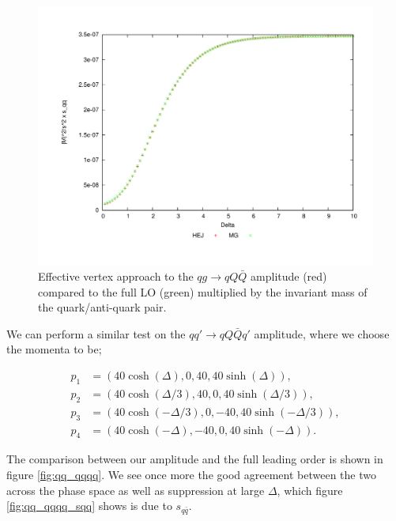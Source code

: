 \begin{figure}[H]
\centering
\includegraphics[scale=0.45]{Images/qg_qQQx_sqqx.pdf}
\caption{Effective vertex approach to the $qg \to qQ\bar{Q}$ amplitude (red) compared to the full LO (green) multiplied by the invariant mass of the quark/anti-quark pair.}
\label{fig:qg_qqqx_sqqx}
\end{figure}

We can perform a similar test on the $qq' \to qQ\bar{Q}q'$ amplitude, where we choose the momenta to be;

\begin{equation}
\begin{split}
p_1 & = (40 \cosh(\Delta), 0, 40, 40 \sinh(\Delta)), \\
p_2 & = (40 \cosh(\Delta/3), 40, 0, 40 \sinh(\Delta/3)), \\
p_3 & = (40 \cosh(-\Delta/3), 0, -40, 40 \sinh(-\Delta/3)), \\
p_4 & = (40 \cosh(-\Delta), -40, 0, 40 \sinh(-\Delta)). 
\end{split}
\label{eqn:4jetmom}
\end{equation}

The comparison between our amplitude and the full leading order is shown in figure \ref{fig:qq_qqqq}. We see once more the good agreement between the two across the phase space as well as suppression at large $\Delta$, which figure \ref{fig:qq_qqqq_sqq} shows is due to $s_{q \bar{q}}$. 

